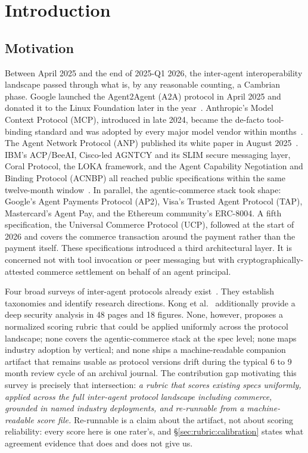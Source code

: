 \section{Introduction}
\label{sec:intro}

\subsection{Motivation}
\label{sec:intro:motivation}

Between April 2025 and the end of 2025-Q1 2026, the inter-agent
interoperability landscape passed through what is, by any reasonable
counting, a Cambrian phase. Google launched the Agent2Agent (A2A)
protocol in April 2025 and donated it to the Linux Foundation later in
the year~\cite{spec_a2a, lf_aaif}. Anthropic's Model Context Protocol
(MCP), introduced in late 2024, became the de-facto tool-binding
standard and was adopted by every major model vendor within
months~\cite{spec_mcp}. The Agent Network Protocol (ANP) published its
white paper in August 2025~\cite{spec_anp}. IBM's ACP/BeeAI,
Cisco-led AGNTCY and its SLIM secure messaging layer, Coral Protocol,
the LOKA framework, and the Agent Capability Negotiation and Binding
Protocol (ACNBP) all reached public specifications within the same
twelve-month window~\cite{spec_coral, spec_loka, spec_acnbp}.
In parallel, the agentic-commerce stack took shape: Google's Agent
Payments Protocol (AP2), Visa's Trusted Agent Protocol (TAP),
Mastercard's Agent Pay, and the Ethereum community's ERC-8004.
A fifth specification, the Universal Commerce Protocol (UCP),
followed at the start of 2026 and covers the commerce transaction
around the payment rather than the payment itself.
These specifications introduced a third architectural layer. It is
concerned not with tool invocation or peer messaging but with
cryptographically-attested commerce settlement on behalf of an
agent principal.

Four broad surveys of inter-agent protocols already
exist~\cite{yang2025survey, ehtesham2025interop, kong2025communication,
commcentric2025survey}. They establish taxonomies and identify research
directions. Kong et al.~\cite{kong2025communication} additionally
provide a deep security analysis in 48 pages and 18 figures. None,
however, proposes a normalized scoring rubric that could be applied
uniformly across the protocol landscape; none covers the
agentic-commerce stack at the spec level; none maps industry adoption
by vertical; and none ships a machine-readable companion artifact that
remains usable as protocol versions drift during the typical 6 to 9
month review cycle of an archival journal. The contribution gap
motivating this survey is
precisely that intersection:
\emph{a rubric that scores existing specs uniformly, applied across the
full inter-agent protocol landscape including commerce, grounded in
named industry deployments, and re-runnable from a machine-readable
score file.} Re-runnable is a claim about the artifact, not about
scoring reliability: every score here is one rater's, and
\S\ref{sec:rubric:calibration} states what agreement evidence that
does and does not give us.

